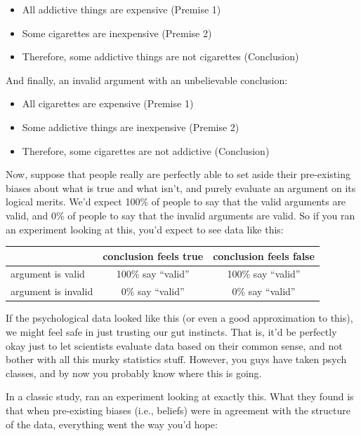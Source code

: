 \documentclass[
]{book}
\providecommand{\tightlist}{%
  \setlength{\itemsep}{0pt}\setlength{\parskip}{0pt}}
\begin{document}
\begin{itemize}
\tightlist
\item
  All addictive things are expensive (Premise 1)
\item
  Some cigarettes are inexpensive (Premise 2)
\item
  Therefore, some addictive things are not cigarettes (Conclusion)
\end{itemize}

And finally, an invalid argument with an unbelievable conclusion:

\begin{itemize}
\tightlist
\item
  All cigarettes are expensive (Premise 1)
\item
  Some addictive things are inexpensive (Premise 2)
\item
  Therefore, some cigarettes are not addictive (Conclusion)
\end{itemize}

Now, suppose that people really are perfectly able to set aside their pre-existing biases about what is true and what isn't, and purely evaluate an argument on its logical merits. We'd expect 100\% of people to say that the valid arguments are valid, and 0\% of people to say that the invalid arguments are valid. So if you ran an experiment looking at this, you'd expect to see data like this:

\begin{longtable}[]{@{}lcc@{}}
\toprule
& conclusion feels true & conclusion feels false \\
\midrule
\endhead
argument is valid & 100\% say ``valid'' & 100\% say ``valid'' \\
argument is invalid & 0\% say ``valid'' & 0\% say ``valid'' \\
\bottomrule
\end{longtable}

If the psychological data looked like this (or even a good approximation to this), we might feel safe in just trusting our gut instincts. That is, it'd be perfectly okay just to let scientists evaluate data based on their common sense, and not bother with all this murky statistics stuff. However, you guys have taken psych classes, and by now you probably know where this is going.

In a classic study, \citet{Evans1983} ran an experiment looking at exactly this. What they found is that when pre-existing biases (i.e., beliefs) were in agreement with the structure of the data, everything went the way you'd hope:
\end{document}
